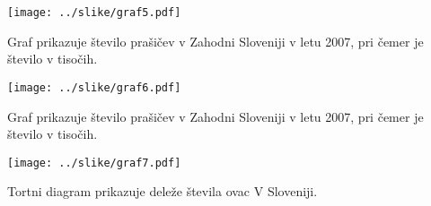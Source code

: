 \documentclass[11pt,a4paper]{article}
\begin{document}
\texttt{[image: ../slike/graf5.pdf]}

Graf prikazuje število prašičev v Zahodni Sloveniji v letu 2007, pri čemer je število v tisočih.

\texttt{[image: ../slike/graf6.pdf]}

Graf prikazuje število prašičev v Zahodni Sloveniji v letu 2007, pri čemer je število v tisočih.

\texttt{[image: ../slike/graf7.pdf]}

Tortni diagram prikazuje deleže števila ovac V Sloveniji.


% 
\end{document}
